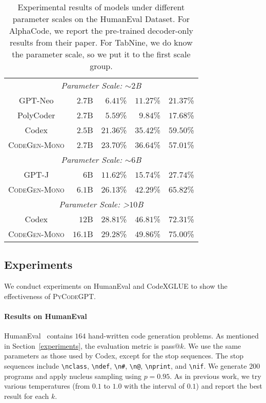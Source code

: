 \documentclass{article}
\newcommand{\codepy}{\textsc{PyCodeGPT}\xspace}
\begin{document}
\begin{table}[t]
{\begin{tabular}{crrrr}
		\multicolumn{5}{c}{\textit{Parameter Scale:  ${\sim}2$B}} \\
		GPT-Neo        & $2.7$B & $6.41$\%    & $11.27$\%   & $21.37$\% \\
		PolyCoder       & $2.7$B & $5.59$\%    & $9.84$\%    & $17.68$\% \\ 
        Codex       & $2.5$B & $21.36$\%   & $35.42$\%   & $\mathbf{59.50}$\% \\
	    \textsc{CodeGen-Mono} & $2.7$B & $\mathbf{23.70}$\%    & $\mathbf{36.64}$\%    & $57.01$\% \\
\midrule
        \multicolumn{5}{c}{\textit{Parameter Scale:  ${\sim}6$B}} \\
        GPT-J  & $6$B & $11.62$\%   & $15.74$\%   & $27.74$\% \\ 
        \textsc{CodeGen-Mono} & $6.1$B & $\mathbf{26.13}$\%    & $\mathbf{42.29}$\%    & $\mathbf{65.82}$\% \\
        \midrule
        \multicolumn{5}{c}{\textit{Parameter Scale:  \textgreater$10$B}} \\
        Codex        & $12$B & $28.81$\%   & $46.81$\%   & $72.31$\% \\ 
        \textsc{CodeGen-Mono} & $16.1$B & $\mathbf{29.28}$\%    & $\mathbf{49.86}$\%    & $\mathbf{75.00}$\% \\
		\bottomrule
	\end{tabular}
	}
	\caption{Experimental results of models under different parameter scales on the HumanEval Dataset. For AlphaCode, we report the pre-trained decoder-only results from their paper. For TabNine, we do know the parameter scale, so we put it to the first scale group.}
	\label{Table:HumanEval}
\end{table}

\subsection{Experiments}
We conduct experiments on HumanEval and CodeXGLUE to show the effectiveness of \codepy.
\paragraph{Results on HumanEval}
HumanEval~\cite{chen2021evaluating} contains $164$ hand-written code generation problems. As mentioned in Section~\ref{experiments}, the evaluation metric is pass$@k$. We use the same parameters as those used by Codex, except for the stop sequences. The stop sequences include \verb|\nclass|, \verb|\ndef|, \verb|\n#|, \verb|\n@|, \verb|\nprint|, and \verb|\nif|. We generate $200$ programs and apply nucleus sampling using $p = 0.95$. As in previous work, we try various temperatures (from $0.1$ to $1.0$ with the interval of $0.1$) and report the best result for each $k$. 
\end{document}

